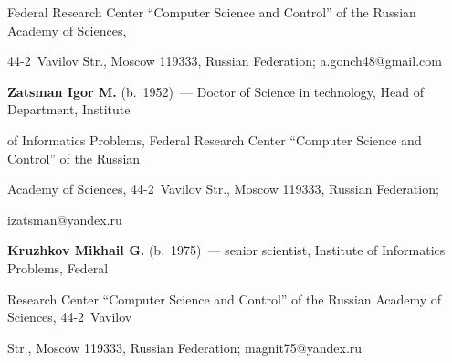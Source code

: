 Federal Research Center ``Computer Science and Control'' of the Russian Academy of Sciences,  


44-2~Vavilov Str., Moscow 119333, Russian Federation; \mbox{a.gonch48@gmail.com}





\vspace*{3pt}





\noindent


\textbf{Zatsman Igor M.} (b.\ 1952)~--- Doctor of Science in technology, Head of Department, Institute 


of Informatics Problems, Federal Research Center ``Computer Science and Control'' of the Russian 


Academy of Sciences, 44-2~Vavilov Str., Moscow 119333, Russian Federation; 


\mbox{izatsman@yandex.ru}





\vspace*{3pt}





\noindent


\textbf{Kruzhkov Mikhail G.} (b.\ 1975)~--- senior scientist, Institute of Informatics Problems, Federal 


Research Center ``Computer Science and Control'' of the Russian Academy of Sciences, 44-2~Vavilov 


Str., Moscow 119333, Russian Federation; \mbox{magnit75@yandex.ru}





\label{end\stat}





\renewcommand{\bibname}{\protect\rm Литература}


